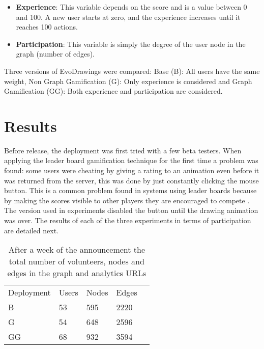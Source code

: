 \begin{itemize}
\item {\bf Experience}: This variable depends on the score and is a value 
between 0 and 100. A new user starts at zero, and the experience increases until
it reaches 100 actions.

\item {\bf Participation}: This variable is simply the degree of the user node 
in the graph (number of edges).    
\end{itemize}

Three versions of EvoDrawings were compared: Base (B): All users have the same weight,
Non Graph Gamification (G): Only experience is considered and Graph Gamification (GG): 
Both experience and participation are considered.  

\section{Results}
\label{sec:results} 
Before release, the deployment was first tried with a few beta testers. 
When applying the leader board gamification technique for the first time a 
problem was found: some users were cheating by giving a
rating to an animation even before it was returned from the server, this was done by just
constantly clicking the mouse button. This is a common problem found in systems using leader
boards because by making the scores visible to other players they are encouraged 
to compete \cite{hickman2010total}. The version used in experiments disabled the button until 
the drawing animation was over. The results of each of the three experiments in 
terms of participation are detailed next.

\begin{table}
  \small
  \caption{After a week of the announcement the total number of volunteers, 
  nodes and edges in the graph and analytics URLs}
  \label{tab:urls} 
  \centering
  \small
  \begin{tabular}{l l l l l}
    \hline\noalign{\smallskip}
     Deployment &  Users &  Nodes &  Edges \\
    \noalign{\smallskip}\hline\noalign{\smallskip}
    B   & 53 &  595   & 2220   \\ \hline
    G   & 54 &  648   & 2596   \\ \hline
    GG  & 68 &  932   & 3594   \\ \hline
    \end{tabular}
\end{table}

